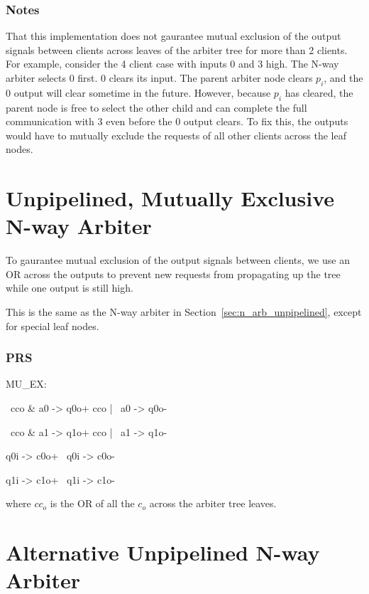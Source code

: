 \documentclass[aer.tex]{subfiles}
\begin{document}
\subsubsection*{Notes}

That this implementation does not gaurantee mutual exclusion of the output signals between clients across leaves of the arbiter tree for more than 2 clients. 
For example, consider the 4 client case with inputs 0 and 3 high. The N-way arbiter selects 0 first. 0 clears its input. The parent arbiter node clears $p_i$, and the 0 output will clear sometime in the future. 
However, because $p_i$ has cleared, the parent node is free to select the other child and can complete the full communication with 3 even before the 0 output clears. 
To fix this, the outputs would have to mutually exclude the requests of all other clients across the leaf nodes.


\section{Unpipelined, Mutually Exclusive N-way Arbiter}

To gaurantee mutual exclusion of the output signals between clients, we use an OR across the outputs to prevent new requests from propagating up the tree while one output is still high.

This is the same as the N-way arbiter in Section~\ref{sec:n_arb_unpipelined}, except for special leaf nodes.

\subsubsection*{PRS}

MU\_EX:

\begin{prs2}
~cco & a0 -> q0o+
cco | ~a0 -> q0o-

~cco & a1 -> q1o+
cco | ~a1 -> q1o-
\end{prs2}

\begin{prs2}
q0i -> c0o+
~q0i -> c0o-

q1i -> c1o+
~q1i -> c1o-
\end{prs2}

where $cc_o$ is the OR of all the $c_o$ across the arbiter tree leaves.

\section{Alternative Unpipelined N-way Arbiter}
\end{document}
